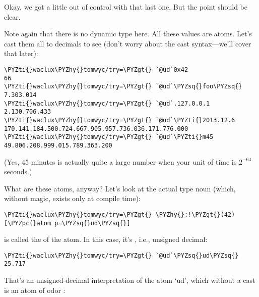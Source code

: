 Okay, we got a little out of control with that last one.  But the
point should be clear.

Note again that there is no dynamic type here.  All these values
are atoms.  Let's cast them all to decimals to see (don't worry
about the cast syntax---we'll cover that later):

\begin{framed_shaded}
\begin{Verbatim}[fontsize=\relsize{-2.5},fontseries=b,commandchars=\\\{\}]
\PYZti{}waclux\PYZhy{}tomwyc/try=\PYZgt{} `@ud`0x42
66
\PYZti{}waclux\PYZhy{}tomwyc/try=\PYZgt{} `@ud`\PYZsq{}foo\PYZsq{}
7.303.014
\PYZti{}waclux\PYZhy{}tomwyc/try=\PYZgt{} `@ud`.127.0.0.1
2.130.706.433
\PYZti{}waclux\PYZhy{}tomwyc/try=\PYZgt{} `@ud`\PYZti{}2013.12.6
170.141.184.500.724.667.905.957.736.036.171.776.000
\PYZti{}waclux\PYZhy{}tomwyc/try=\PYZgt{} `@ud`\PYZti{}m45
49.806.208.999.015.789.363.200
\end{Verbatim}
\end{framed_shaded}

(Yes, 45 minutes is actually quite a large number when your unit
of time is \( 2^{-64} \) seconds.)

What are these atoms, anyway?  Let's look at the actual type noun
(which, without magic, exists only at compile time):

\begin{framed_shaded}
\begin{Verbatim}[fontsize=\relsize{-2.5},fontseries=b,commandchars=\\\{\}]
\PYZti{}waclux\PYZhy{}tomwyc/try=\PYZgt{} \PYZhy{}:!\PYZgt{}(42)
[\PYZpc{}atom p=\PYZsq{}ud\PYZsq{}]
\end{Verbatim}
\end{framed_shaded}

 is called the  of the atom.  In this case, it's ,
i.e., unsigned decimal:

\begin{framed_shaded}
\begin{Verbatim}[fontsize=\relsize{-2.5},fontseries=b,commandchars=\\\{\}]
\PYZti{}waclux\PYZhy{}tomwyc/try=\PYZgt{} `@ud`\PYZsq{}ud\PYZsq{}
25.717
\end{Verbatim}
\end{framed_shaded}

That's an unsigned-decimal interpretation of the atom `ud', which
without a cast is an atom of odor :

